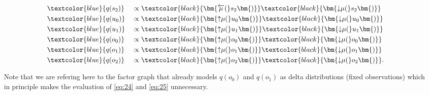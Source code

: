 \begin{minipage}[t]{0.5\textwidth}
    \setlength{\abovedisplayskip}{0pt}
    \setlength{\belowdisplayskip}{0pt}
    \begin{alignat}{2}
         & \textcolor{blue}{q(s_2)} &  & \propto \textcolor{black}{\bm{\overleftarrow{\mu}(}s_2\bm{)}} \textcolor{black}{\bm{{\downarrow}{\mu}(}s_2\bm{)}}           \\
         & \textcolor{blue}{q(u_0)} &  & \propto \textcolor{black}{\bm{{\uparrow}{\mu}(}u_0\bm{)}} \textcolor{black}{\bm{{\downarrow}{\mu}(}u_0\bm{)}}               \\
         & \textcolor{blue}{q(u_1)} &  & \propto \textcolor{black}{\bm{{\uparrow}{\mu}(}u_1\bm{)}} \textcolor{black}{\bm{{\downarrow}{\mu}(}u_1\bm{)}}               \\
         & \textcolor{blue}{q(o_0)} &  & \propto \textcolor{black}{\bm{{\uparrow}{\mu}(}o_0\bm{)}} \textcolor{black}{\bm{{\downarrow}{\mu}(}o_0\bm{)}} \label{eq:24} \\
         & \textcolor{blue}{q(o_1)} &  & \propto \textcolor{black}{\bm{{\uparrow}{\mu}(}o_1\bm{)}} \textcolor{black}{\bm{{\downarrow}{\mu}(}o_1\bm{)}} \label{eq:25} \\
         & \textcolor{blue}{q(o_2)} &  & \propto \textcolor{black}{\bm{{\uparrow}{\mu}(}o_2\bm{)}} \textcolor{black}{\bm{{\downarrow}{\mu}(}o_2\bm{)}}.
    \end{alignat}
\end{minipage}

\vspace{1em}
Note that we are refering here to the factor graph that already models \(q(o_0)\) and \(q(o_1)\) as delta distributions (fixed observations) which in principle makes the evaluation of \cref{eq:24} and \cref{eq:25} unnecessary.

